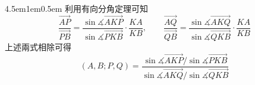 \documentclass[12pt]{article}
\begin{document}
\begin{mybox}{4.5em}{1em}{0.5em}
    利用有向分角定理可知
    \begin{equation*}
        \frac{\overrightarrow{AP}}{\overrightarrow{PB}}
        =\frac{\sin{\measuredangle{\overrightarrow{AKP}}}}{\sin{\measuredangle{\overrightarrow{PKB}}}}
        \cdot\frac{KA}{KB},\hspace{2em} \frac{\overrightarrow{AQ}}{\overrightarrow{QB}}
        =\frac{\sin{\measuredangle{\overrightarrow{AKQ}}}}{\sin{\measuredangle{\overrightarrow{QKB}}}}
        \cdot\frac{KA}{KB}
    \end{equation*}
    上述兩式相除可得
    \begin{equation*}
        \left(A,B;P,Q\right)=\frac{\sin{\measuredangle{\overrightarrow{AKP}}}/\sin{\measuredangle{\overrightarrow{PKB}}}}
        {\sin{\measuredangle{\overrightarrow{AKQ}}}/\sin{\measuredangle{\overrightarrow{QKB}}}}
    \end{equation*}
\end{mybox}
\end{document}
